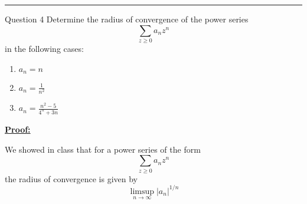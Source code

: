 \documentclass{article}
\begin{document}
\vskip 0.5cm
\hrule 
\vskip 0.5cm

\begin{mathdefinitionbox}{Question 4}
\vskip 0.5cm
Determine the radius of convergence of the power series 
\[ \sum_{z \geq 0} a_n z^n  \]
in the following cases:
\begin{enumerate}[label=(\alph*)]
  \item $a_n = n$
  \item $a_n = \frac{1}{n^2}$
  \item $a_n = \frac{n^2 - 5}{4^n + 3n}$
\end{enumerate}
\end{mathdefinitionbox}

\vskip 0.5cm
\underline{\textbf{Proof:}}

\vskip 0.5cm
We showed in class that for a power series of the form
\[ \sum_{z \geq 0} a_n z^n  \]
the radius of convergence is given by 
\[ \limsup_{n \rightarrow \infty} \lvert a_n \rvert^{1/n} \]
\end{document}
